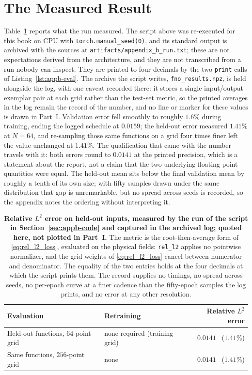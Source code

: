 \section{The Measured Result}
\label{sec:appb-result}

Table~\ref{tab:appb-measured} reports what the run measured. The script
above was re-executed for this book on CPU with \texttt{torch.manual\_seed(0)}, and its
standard output is archived with the sources at \texttt{artifacts/appendix\_b\_run.txt};
these are not expectations derived from the architecture, and they are not transcribed from a
run nobody can inspect. They are printed to four decimals by the two \texttt{print} calls of
Listing~\ref{lst:appb-eval}. The archive the script writes, \texttt{fno\_results.npz}, is
held alongside the log, with one caveat recorded there: it stores a single input/output
exemplar pair at each grid rather than the test-set metric, so the printed averages in the log
remain the record of the number, and no line or marker for these values is drawn in Part~I. Validation error fell
smoothly to roughly $1.6\%$ during training, ending the logged schedule at $0.0159$; the
held-out error measured $1.41\%$ at $N=64$, and re-sampling those same functions on a grid
four times finer left the value unchanged at $1.41\%$. The
qualification that came with the number travels with it: both errors round to $0.0141$
at the printed precision, which is a statement about the report, not a claim that the two
underlying floating-point quantities were equal. The held-out mean sits below the final
validation mean by roughly a tenth of its own size; with fifty samples drawn under the same
distribution that gap is unremarkable, but no spread across seeds is recorded, so the
appendix notes the ordering without interpreting it.

\begin{table}[htbp]
\centering
\caption{\textbf{Relative $L^2$ error on held-out inputs, measured by the run of
the script in Section~\ref{sec:appb-code} and captured in the archived log; quoted here,
not plotted in Part~I.} The metric is
the root-then-average form of \eqref{eq:rel_l2_loss}, evaluated on the physical fields:
\texttt{rel\_l2} applies no pointwise normalizer, and the grid weights of
\eqref{eq:rel_l2_loss} cancel between numerator and denominator. The equality of the two
entries holds at the four decimals at which the script prints them. The record supplies
no timings, no spread across seeds, no per-epoch curve at a finer cadence than the
fifty-epoch samples the log prints, and no error at any other
resolution.}
\label{tab:appb-measured}
\begin{tabular}{@{}llr@{}}
\toprule
\textbf{Evaluation} & \textbf{Retraining} & \textbf{Relative $L^2$ error} \\
\midrule
Held-out functions, $64$-point grid & none required (training grid) & $0.0141$ \ ($1.41\%$) \\
Same functions, $256$-point grid & none & $0.0141$ \ ($1.41\%$) \\
\bottomrule
\end{tabular}
\end{table}

